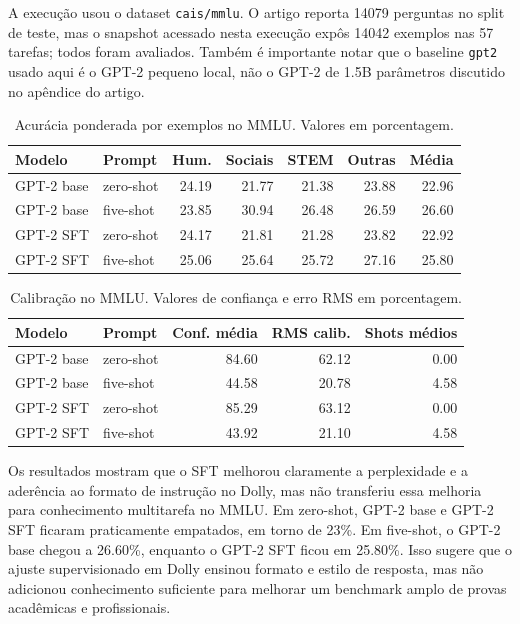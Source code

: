\documentclass[a4paper,12pt]{article}
\begin{document}
A execução usou o dataset \texttt{cais/mmlu}. O artigo reporta 14079 perguntas no split de teste, mas o snapshot acessado nesta execução expôs 14042 exemplos nas 57 tarefas; todos foram avaliados. Também é importante notar que o baseline \texttt{gpt2} usado aqui é o GPT-2 pequeno local, não o GPT-2 de 1.5B parâmetros discutido no apêndice do artigo.

\begin{table}[h]
\centering
\small
\begin{tabular}{|l|l|r|r|r|r|r|}
\hline
\textbf{Modelo} & \textbf{Prompt} & \textbf{Hum.} & \textbf{Sociais} & \textbf{STEM} & \textbf{Outras} & \textbf{Média} \\
\hline
GPT-2 base & zero-shot & 24.19 & 21.77 & 21.38 & 23.88 & 22.96 \\
GPT-2 base & five-shot & 23.85 & 30.94 & 26.48 & 26.59 & 26.60 \\
GPT-2 SFT & zero-shot & 24.17 & 21.81 & 21.28 & 23.82 & 22.92 \\
GPT-2 SFT & five-shot & 25.06 & 25.64 & 25.72 & 27.16 & 25.80 \\
\hline
\end{tabular}
\caption{Acurácia ponderada por exemplos no MMLU. Valores em porcentagem.}
\end{table}

\begin{table}[h]
\centering
\small
\begin{tabular}{|l|l|r|r|r|}
\hline
\textbf{Modelo} & \textbf{Prompt} & \textbf{Conf. média} & \textbf{RMS calib.} & \textbf{Shots médios} \\
\hline
GPT-2 base & zero-shot & 84.60 & 62.12 & 0.00 \\
GPT-2 base & five-shot & 44.58 & 20.78 & 4.58 \\
GPT-2 SFT & zero-shot & 85.29 & 63.12 & 0.00 \\
GPT-2 SFT & five-shot & 43.92 & 21.10 & 4.58 \\
\hline
\end{tabular}
\caption{Calibração no MMLU. Valores de confiança e erro RMS em porcentagem.}
\end{table}

Os resultados mostram que o SFT melhorou claramente a perplexidade e a aderência ao formato de instrução no Dolly, mas não transferiu essa melhoria para conhecimento multitarefa no MMLU. Em zero-shot, GPT-2 base e GPT-2 SFT ficaram praticamente empatados, em torno de 23\%. Em five-shot, o GPT-2 base chegou a 26.60\%, enquanto o GPT-2 SFT ficou em 25.80\%. Isso sugere que o ajuste supervisionado em Dolly ensinou formato e estilo de resposta, mas não adicionou conhecimento suficiente para melhorar um benchmark amplo de provas acadêmicas e profissionais.
\end{document}
